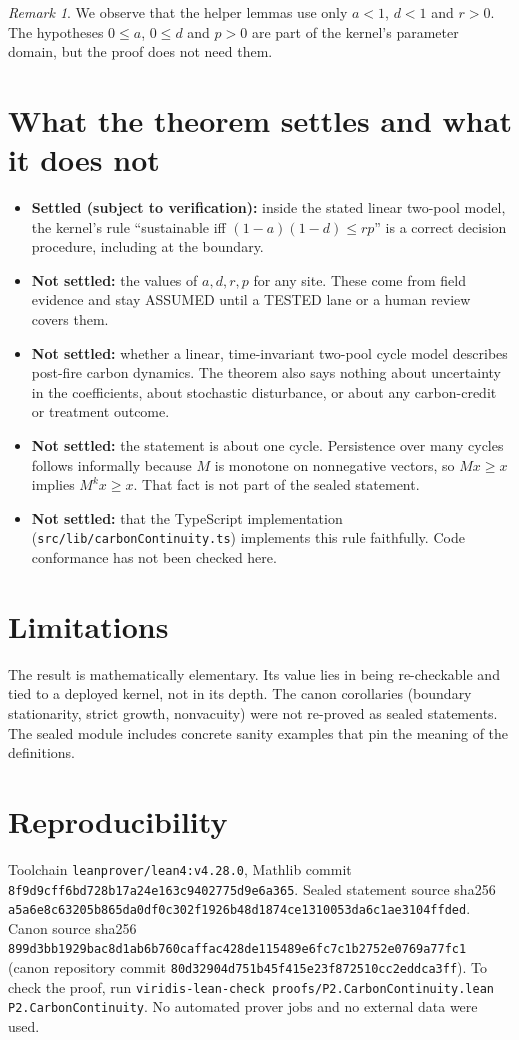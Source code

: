 \documentclass[11pt]{article}
\theoremstyle{remark}
\newtheorem{remark}[theorem]{Remark}
\begin{document}
\begin{remark}
We observe that the helper lemmas use only $a<1$, $d<1$ and $r>0$.
The hypotheses $0\le a$, $0\le d$ and $p>0$ are part of the kernel's parameter domain,
but the proof does not need them.
\end{remark}

\section{What the theorem settles and what it does not}
\begin{itemize}
\item \textbf{Settled (subject to verification):} inside the stated linear two-pool model, the kernel's rule
``sustainable iff $(1-a)(1-d)\le rp$'' is a correct decision procedure, including at the boundary.
\item \textbf{Not settled:} the values of $a,d,r,p$ for any site. These come from field evidence and stay ASSUMED
until a TESTED lane or a human review covers them.
\item \textbf{Not settled:} whether a linear, time-invariant two-pool cycle model describes post-fire carbon
dynamics. The theorem also says nothing about uncertainty in the coefficients, about stochastic disturbance,
or about any carbon-credit or treatment outcome.
\item \textbf{Not settled:} the statement is about one cycle. Persistence over many cycles follows informally
because $M$ is monotone on nonnegative vectors, so $Mx\ge x$ implies $M^{k}x\ge x$. That fact is not part of the
sealed statement.
\item \textbf{Not settled:} that the TypeScript implementation (\texttt{src/lib/carbonContinuity.ts})
implements this rule faithfully. Code conformance has not been checked here.
\end{itemize}

\section{Limitations}
The result is mathematically elementary. Its value lies in being re-checkable and tied to a deployed kernel,
not in its depth. The canon corollaries (boundary stationarity, strict growth, nonvacuity) were not re-proved
as sealed statements. The sealed module includes concrete sanity examples that pin the meaning of the definitions.

\section{Reproducibility}
Toolchain \texttt{leanprover/lean4:v4.28.0}, Mathlib commit \texttt{8f9d9cff6bd728b17a24e163c9402775d9e6a365}.
Sealed statement source sha256 \texttt{a5a6e8c63205b865da0df0c302f1926b48d1874ce1310053da6c1ae3104ffded}.
Canon source sha256 \texttt{899d3bb1929bac8d1ab6b760caffac428de115489e6fc7c1b2752e0769a77fc1}
(canon repository commit \texttt{80d32904d751b45f415e23f872510cc2eddca3ff}).
To check the proof, run \texttt{viridis-lean-check proofs/P2.CarbonContinuity.lean P2.CarbonContinuity}.
No automated prover jobs and no external data were used.
\end{document}
